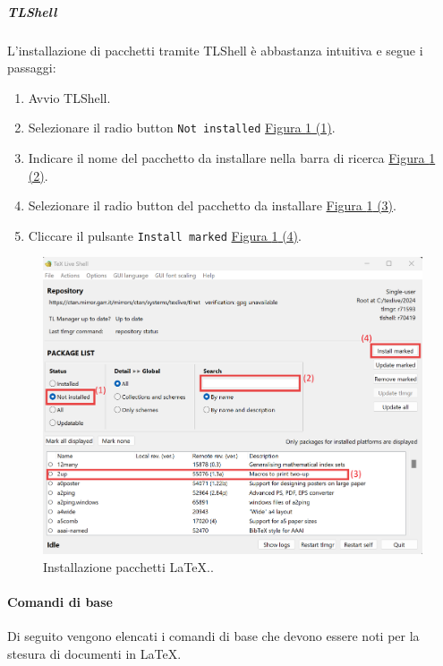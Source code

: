\subparagraph{TLShell}
\label{subpar:TLShell}
L'installazione di pacchetti tramite TLShell è abbastanza intuitiva e segue i passaggi:
\begin{enumerate}
    \item Avvio TLShell.
    \item Selezionare il radio button \texttt{Not installed} \hyperref[fig:installazione_pacchetti]{Figura \ref{fig:installazione_pacchetti} (1)}.
    \item Indicare il nome del pacchetto da installare nella barra di ricerca \hyperref[fig:installazione_pacchetti]{Figura \ref{fig:installazione_pacchetti} (2)}.
    \item Selezionare il radio button del pacchetto da installare \hyperref[fig:installazione_pacchetti]{Figura \ref{fig:installazione_pacchetti} (3)}.
    \item Cliccare il pulsante \texttt{Install marked} \hyperref[fig:installazione_pacchetti]{Figura \ref{fig:installazione_pacchetti} (4)}.
\end{enumerate}
\begin{figure}[H]
    \includegraphics[scale=0.7]{Sezioni/ProcessiDiSupporto/Immagini/installazione_pacchetti.png}
    \caption{Installazione pacchetti LaTeX..}
    \label{fig:installazione_pacchetti}
\end{figure}

\paragraph{Comandi di base}
\label{par:comandi_di_base}
Di seguito vengono elencati i comandi di base che devono essere noti per la stesura di documenti in LaTeX.

